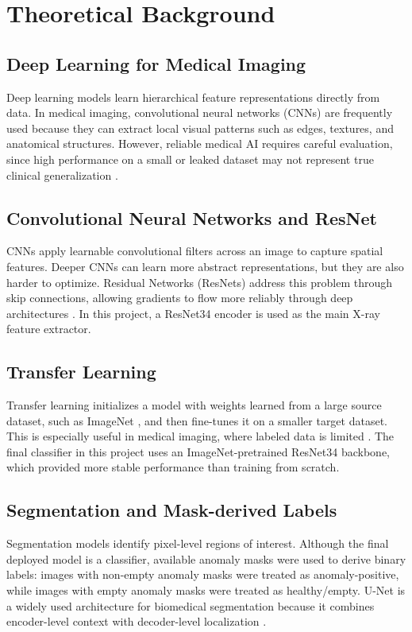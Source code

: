 \chapter{Theoretical Background}
\label{ch:theory}

\section{Deep Learning for Medical Imaging}
Deep learning models learn hierarchical feature representations directly from data. In medical imaging, convolutional neural networks (CNNs) are frequently used because they can extract local visual patterns such as edges, textures, and anatomical structures. However, reliable medical AI requires careful evaluation, since high performance on a small or leaked dataset may not represent true clinical generalization \cite{litjens2017survey,roberts2021common}.

\section{Convolutional Neural Networks and ResNet}
CNNs apply learnable convolutional filters across an image to capture spatial features. Deeper CNNs can learn more abstract representations, but they are also harder to optimize. Residual Networks (ResNets) address this problem through skip connections, allowing gradients to flow more reliably through deep architectures \cite{he2016resnet}. In this project, a ResNet34 encoder is used as the main X-ray feature extractor.

\section{Transfer Learning}
Transfer learning initializes a model with weights learned from a large source dataset, such as ImageNet \cite{deng2009imagenet}, and then fine-tunes it on a smaller target dataset. This is especially useful in medical imaging, where labeled data is limited \cite{litjens2017survey}. The final classifier in this project uses an ImageNet-pretrained ResNet34 backbone, which provided more stable performance than training from scratch.

\section{Segmentation and Mask-derived Labels}
Segmentation models identify pixel-level regions of interest. Although the final deployed model is a classifier, available anomaly masks were used to derive binary labels: images with non-empty anomaly masks were treated as anomaly-positive, while images with empty anomaly masks were treated as healthy/empty. U-Net is a widely used architecture for biomedical segmentation because it combines encoder-level context with decoder-level localization \cite{ronneberger2015u}.

